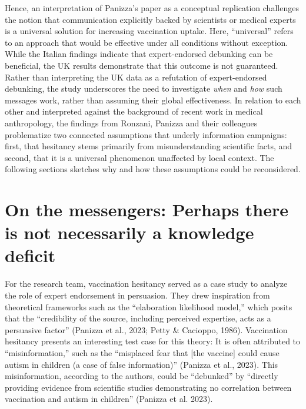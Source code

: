 \documentclass[authordate, reflection,issue]{jote-new-article}
\begin{document}
	Hence, an interpretation of Panizza's paper as a conceptual replication challenges the notion that communication explicitly backed by scientists or medical experts is a universal solution for increasing vaccination uptake. Here, “universal” refers to an approach that would be effective under all conditions without exception. While the Italian findings indicate that expert-endorsed debunking can be beneficial, the UK results demonstrate that this outcome is not guaranteed. Rather than interpreting the UK data as a refutation of expert-endorsed debunking, the study underscores the need to investigate \emph{when} and \emph{how} such messages work, rather than assuming their global effectiveness. In relation to each other and interpreted against the background of recent work in medical anthropology, the findings from Ronzani, Panizza and their colleagues problematize two connected assumptions that underly information campaigns: first, that hesitancy stems primarily from misunderstanding scientific facts, and second, that it is a universal phenomenon unaffected by local context. The following sections sketches why and how these assumptions could be reconsidered.



	\section{On the messengers: Perhaps there is not necessarily a knowledge deficit}



	For the research team, vaccination hesitancy served as a case study to analyze the role of expert endorsement in persuasion. They drew inspiration from theoretical frameworks such as the “elaboration likelihood model,” which posits that the “credibility of the source, including perceived expertise, acts as a persuasive factor” (Panizza et al., 2023; Petty \& Cacioppo, 1986). Vaccination hesitancy presents an interesting test case for this theory: It is often attributed to “misinformation,” such as the “misplaced fear that [the vaccine] could cause autism in children (a case of false information)” (Panizza et al., 2023). This misinformation, according to the authors, could be “debunked” by “directly providing evidence from scientific studies demonstrating no correlation between vaccination and autism in children” (Panizza et al. 2023).
\end{document}
